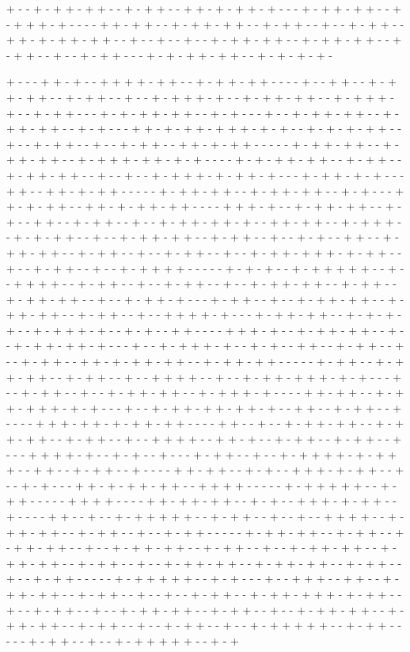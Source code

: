 + - - + - + + - + + - - + - + + - - + + - + - + + - + - - - + - + + - + + - - + - + + + - + - - - - + + - + + - - + - + + - + + - - + - + + - - + - - + - + + - - + + - + - + + - + + - - + - - + - - + - - + - + + - + + - - + - + + - + + - - + - + + - - + - - + - + + - - - + - + - + + - + + - - + - + - + - + - 

+ - - - + + - + - - + + + + - + + - - + - + + - + + - - - - + - - + + - - + - + + - + + - - + - + + - - + - - + - + + + - + - - + - + + - + + - - + - + + + - + - - + - + + - - - + - + - + + - + + - - + - + - - - + - - + - + + - + + - - + - + + - + + - - + - + - - - + + - + - + + - + + + - + - + - - + - + - + - + + - - + - - + - + + - - + - - + - + + - - + + - + - + + - - - - - + - + + - + + - - + - + + - + + - - + - + + + - + + - + - + - - - - + - + - + + - + + - - + - + + - - + - + + - + + - - + - - + - - + - + + + - + - + + - + - - - + - + + - + - + - - - + + - - + + - + - + + - - - - - + - + + - + + - - + - + + - + + - - + - + - - - + + - + - + + - - + + - + - + + - + + - - - - + + + - + - - + - + + - + + - - + - + - - + + - - + - + + - - + - - + - + + - + + - + - - + + - + + - - + - + + + - - + - + - + + - - + - - + - + + - + + - - + - + + - - + - - + - + - - + + - - + - + + - + + - - + - + + - - + - - + - + + - - + - - + - + + - + + + - + - + + - - + - - + - + + - - + - - + - + + + + - - - - - + - + - + - - + - + + + + + - - + - - + + + + - - + - + + - - + - - + - + + - - + - - + - + + - + + - - + - + + - - + - + + - + + - - + - - + - + + - + - - - + - + + - - + - - + - + + - + + - - + - + + - + + - - + - + + - - + - - + + + + - + - - - + - + + - + + - - + - + - + - + - - + - + + + - + - - + - + - - + + - - - - + + + - + - - + - + + - + + - - + - - + - + + - + + - + - - - + - - + - + + + - + - - + - + - - + + - - + - + + - - + - - + - + + - - + + - + - + + - + + - - + - + + - + + - - - - - + - + + - - + - + + - + + - - + - + + - - + - - + + + + - - + - - + - + + - + + + - + - + - - - + - - + - + + - - + - - + - + + - + + - - + - + + + - + - - - - + + - + + - - + - + + - + + + - + - + - - - + - - + - + + - + + - + + - + - - + + - - + - + + - - + - - - - + + + - + + - + - + + - + + - - - - + + - - + - - + - + + - + + - - + - + + - + + - - + - + + - - + - - + + + + - - + + - + - - + - + + - - + - + + - - + - - - + + + + - + - - + - + - - + - - - + - + + - - + - - + - + + + + - + - + + + - - + + - - + - + + - - + - - - - + + - + + - - + - + - - + + + - + - + + - - + - - + - + - - - + + - + - + + - + + - - + + + + - - - - - + - + + + + + - - + - + + - - - - - + + + + - - - - + + - + + - + + - - + - + - - + + + - + - + + - - + - - - - + + - - + - - + - + + + + + - - + - + + - - + - - + - - + + + + - - + - + + - + + - - + - + + - - + - - + - + + - - - - - + - + + - + + - - + - + + - - + - + + - + + - - + - - + - + + - + + - - + - + + - - + - - + - + + - + + - - + - + + - + + - - + - + + - - + - - + - + + - + + - - + - + + - + + - - + - + + - - + - - + - + + - - - - - + - + + + + + - - + - + - - - + - - + + + - - + + - - + - + + - + + - - + - + + - - + - - + - - + - + + - - + - + + - + + + - + - + + - - + - - + - + + - - + - - + - + + - + + - - + - + + - - + - - + - + + - + + - - + - + + - + + - - + - + + - - + - - + - + + - - + - - + - + + + + + - - + - + + - - - - - + - + + - - + - - + - + + + + + - - + - + 